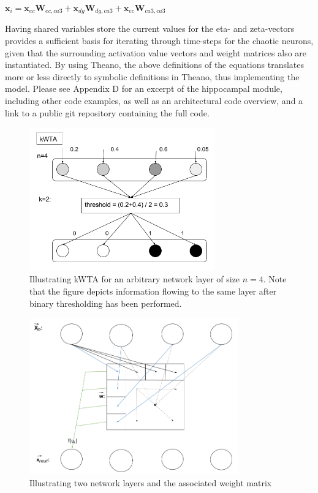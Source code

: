 \begin{center}
\begin{math}
    \textbf{x}_i = \textbf{x}_{ec} \textbf{W}_{ec, ca3} + \textbf{x}_{dg} \textbf{W}_{dg, ca3} + \textbf{x}_{ec} \textbf{W}_{ca3, ca3}
\end{math}
\end{center}

Having shared variables store the current values for the eta- and zeta-vectors provides a sufficient basis for iterating through time-steps for the chaotic neurons, given that the surrounding activation value vectors and weight matrices also are instantiated. By using Theano, the above definitions of the equations translates more or less directly to symbolic definitions in Theano, thus implementing the model. Please see Appendix D for an excerpt of the hippocampal module, including other code examples, as well as an architectural code overview, and a link to a public git repository containing the full code.

\begin{figure}
    \centering
    \includegraphics[width=8cm]{fig/kWTA}
    \caption{Illustrating kWTA for an arbitrary network layer of size $n=4$. Note that the figure depicts information flowing to  the same layer after binary thresholding has been performed.}
    \label{fig:kWTA_illustration}
\end{figure}

\begin{figure}
    \centering
    \includegraphics[width=9cm]{fig/network_propagation}
    \caption{Illustrating two network layers and the associated weight matrix}
    \label{fig:network_layout}
\end{figure}


